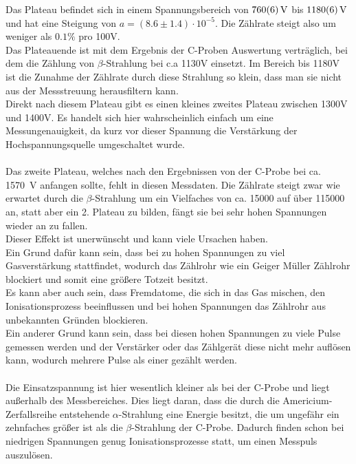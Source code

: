 \documentclass[12pt,a4paper]{article}
\begin{document}
Das Plateau befindet sich in einem Spannungsbereich von $\SI{760\pm 6}{V}$ bis $\SI{1180\pm 6}{V}$ und hat eine Steigung von $a = (8.6\pm1.4)\cdot 10^{-5}$. Die Zählrate steigt also um weniger als $0.1\%$ pro 100V.\\
 Das Plateauende ist mit dem Ergebnis der C-Proben Auswertung verträglich, bei dem die Zählung von $\beta$-Strahlung bei c.a 1130V einsetzt. Im Bereich bis 1180V ist die Zunahme der Zählrate durch diese Strahlung so klein, dass man sie nicht aus der Messstreuung herausfiltern kann.\\
Direkt nach diesem Plateau gibt es einen kleines zweites Plateau zwischen 1300V und 1400V. Es handelt sich hier wahrscheinlich einfach um eine Messungenauigkeit, da kurz vor dieser Spannung die Verstärkung der Hochspannungsquelle umgeschaltet wurde.\\
\\
Das zweite Plateau, welches nach den Ergebnissen von der C-Probe bei ca. \SI{1570}{V} anfangen sollte, fehlt in diesen Messdaten. Die Zählrate steigt zwar wie erwartet durch die $\beta$-Strahlung um ein Vielfaches von ca. 15000 auf über 115000 an, statt aber ein 2. Plateau zu bilden, fängt sie bei sehr hohen Spannungen wieder an zu fallen.\\
Dieser Effekt ist unerwünscht und kann viele Ursachen haben.\\
Ein Grund dafür kann sein, dass bei zu hohen Spannungen zu viel Gasverstärkung stattfindet, wodurch das Zählrohr wie ein Geiger Müller Zählrohr blockiert und somit eine größere Totzeit besitzt.\\
Es kann aber auch sein, dass Fremdatome, die sich in das Gas mischen, den Ionisationsprozess beeinflussen und bei hohen Spannungen das Zählrohr aus unbekannten Gründen blockieren.\\
Ein anderer Grund kann sein, dass bei diesen hohen Spannungen zu viele Pulse gemessen werden und der Verstärker oder das Zählgerät diese nicht mehr auflösen kann, wodurch mehrere Pulse als einer gezählt werden.\\
\\
Die Einsatzspannung ist hier wesentlich kleiner als bei der C-Probe und liegt außerhalb des Messbereiches. Dies liegt daran, dass die durch die Americium-Zerfallsreihe entstehende $\alpha$-Strahlung eine Energie besitzt, die um ungefähr ein zehnfaches größer ist als die $\beta$-Strahlung der C-Probe. Dadurch finden schon bei niedrigen Spannungen genug Ionisationsprozesse statt, um einen Messpuls auszulösen.\\
\end{document}
